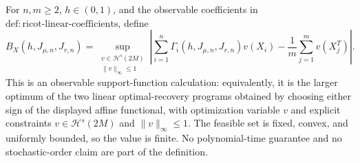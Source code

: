 For \(n,m\ge2\), \(h\in(0,1)\), and the observable coefficients in \(\mathrm{def:ricot\text{-}linear\text{-}coefficients}\), define
\[
B_X(h,J_{\mu,n},J_{r,n})=
\sup_{\substack{v\in\mathcal H^s(2M)\\ \|v\|_\infty\le1}}
\left|
\sum_{i=1}^n\Gamma_i(h,J_{\mu,n},J_{r,n})v(X_i)
-\frac1m\sum_{j=1}^m v(X_j^T)
\right|.
\]
This is an observable support-function calculation: equivalently, it is the larger optimum of the two linear optimal-recovery programs obtained by choosing either sign of the displayed affine functional, with optimization variable \(v\) and explicit constraints \(v\in\mathcal H^s(2M)\) and \(\|v\|_\infty\le1\). The feasible set is fixed, convex, and uniformly bounded, so the value is finite. No polynomial-time guarantee and no stochastic-order claim are part of the definition.